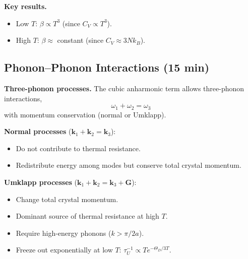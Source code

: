 \documentclass[11pt,a4paper]{article}
\begin{document}
\textbf{Key results.}
\begin{itemize}
\item Low $T$: $\beta\propto T^3$ (since $C_V\propto T^3$).
\item High $T$: $\beta\approx$ constant (since $C_V\approx3Nk_B$).
\end{itemize}

\subsection{Phonon--Phonon Interactions \hfill \small(15 min)}

\textbf{Three-phonon processes.} The cubic anharmonic term allows three-phonon
interactions,
\[
\omega_1+\omega_2=\omega_3
\]
with momentum conservation (normal or Umklapp).

\textbf{Normal processes} ($\mathbf k_1+\mathbf k_2=\mathbf k_3$):
\begin{itemize}
\item Do not contribute to thermal resistance.
\item Redistribute energy among modes but conserve total crystal momentum.
\end{itemize}

\textbf{Umklapp processes} ($\mathbf k_1+\mathbf k_2=\mathbf k_3+\mathbf G$):
\begin{itemize}
\item Change total crystal momentum.
\item Dominant source of thermal resistance at high $T$.
\item Require high-energy phonons ($k>\pi/2a$).
\item Freeze out exponentially at low $T$: $\tau_U^{-1}\propto Te^{-\Theta_D/3T}$.
\end{itemize}
\end{document}
